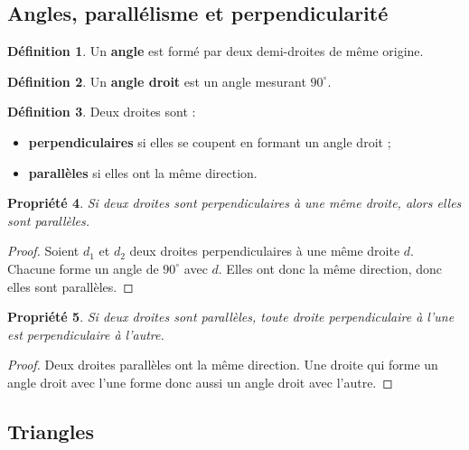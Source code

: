 \documentclass[11pt,a4paper]{article}
\theoremstyle{definition}
\newtheorem{definition}{Définition}[section]
\theoremstyle{plain}
\newtheorem{propriete}[definition]{Propriété}
\begin{document}
\subsection{Angles, parallélisme et perpendicularité}

\begin{definition}
Un \textbf{angle} est formé par deux demi-droites de même origine.
\end{definition}

\begin{definition}
Un \textbf{angle droit} est un angle mesurant $90^\circ$.
\end{definition}

\begin{definition}
Deux droites sont :
\begin{itemize}
    \item \textbf{perpendiculaires} si elles se coupent en formant un angle droit ;
    \item \textbf{parallèles} si elles ont la même direction.
\end{itemize}
\end{definition}

\begin{propriete}
Si deux droites sont perpendiculaires à une même droite, alors elles sont parallèles.
\end{propriete}

\begin{proof}
Soient $d_1$ et $d_2$ deux droites perpendiculaires à une même droite $d$.
Chacune forme un angle de $90^\circ$ avec $d$.
Elles ont donc la même direction, donc elles sont parallèles.
\end{proof}

\begin{propriete}
Si deux droites sont parallèles, toute droite perpendiculaire à l'une est perpendiculaire à l'autre.
\end{propriete}

\begin{proof}
Deux droites parallèles ont la même direction.
Une droite qui forme un angle droit avec l'une forme donc aussi un angle droit avec l'autre.
\end{proof}

\subsection{Triangles}
\end{document}
